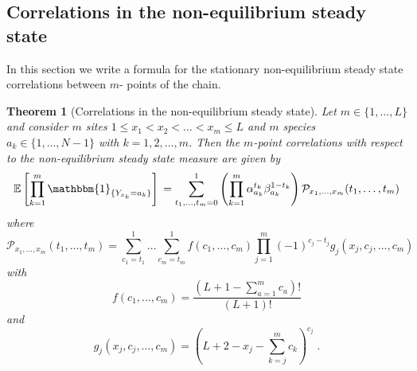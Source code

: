 \documentclass[10pt]{article}
\numberwithin{equation}{section}
\numberwithin{equation}{subsection}
\newtheorem{theorem}{Theorem}
\newcommand{\dt}{\;.}
\begin{document}
\subsection{Correlations in the non-equilibrium steady state}\label{subsection-exact}
In this section we write a formula for the stationary non-equilibrium steady state correlations between $m$- points of the chain.
\begin{theorem}[Correlations in the non-equilibrium steady state]\label{thm-correlations}
Let $m\in \{1,\ldots,L\}$ and consider $m$ sites $1 \le x_{1} < x_2 < \ldots < x_m \le L $ and
$m$ species $a_{k}\in\{1,\ldots,N-1\}$  with $k=1,2,\ldots, m$. Then the $m$-point correlations with respect to the non-equilibrium steady state measure are given by 
\begin{equation}\label{exactCorrelations}
\mathbb{E}\left[\prod_{k=1}^{m}\mathbbm{1}_{\{Y_{x_{k}}=a_{k}\}}\right]\\=\sum_{t_{1},\ldots,t_{m}=0}^{1}\left(\prod_{k=1}^{m}\alpha_{a_{k}}^{t_{k}}\beta_{a_{k}}^{1-t_{k}}\right)\mathcal{P}_{x_{1},\ldots,x_{m}}(t_{1},\ldots,t_{m})
\end{equation}
where
\begin{equation}\label{abs-probabilities}
	\mathcal{P}_{x_{1},\ldots,x_{m}}(t_{1},\ldots,t_{m})=\sum_{c_{1}=t_{1}}^{1}\ldots\sum_{c_{m}=t_{m}}^{1}f(c_{1},\ldots,c_{m})\prod_{j=1}^{m}(-1)^{c_{j}-t_{j}}g_{j}(x_{j},c_{j},\ldots,c_{m})
\end{equation}
with
\begin{equation}\label{powerCoeffNOspec}
	f(c_{1},\ldots,c_{m})=\frac{(L+1-\sum_{a=1}^{m}c_{a})!}{(L+1)!}
\end{equation}
and
\begin{equation}\label{powerCoeffSpecies}
	g_{j}(x_{j},c_{j},\ldots,c_{m})=\left(L+2-x_{j}-\sum_{k=j}^{m}c_{k}\right)^{c_{j}}\dt
\end{equation}
\end{theorem}
\begin{comment}
 Consider . . Then, with respect to the non-equilibrium stationary distribution, the correlations among these particles are given by
\begin{equation}\label{exactCorrelations}
	\mathbb{E}_{\mu}\left[\prod_{k=1}^{m}\mathbbm{1}_{\{\tau_{x_{k}}=a_{k}\}}\right]=\sum_{c_{1},\ldots,c_{m}=0}^{1}
	f(L,c_{1},\ldots,c_{m})\prod_{k=1}^{m}(\alpha_{a_{k}}-\beta_{a_{k}})^{c_{k}}\beta_{a_{k}}^{1-c_{k}}g_{k}(L,y_{k},c_{k},\ldots,c_{m})
\end{equation}
\end{comment}
\end{document}
